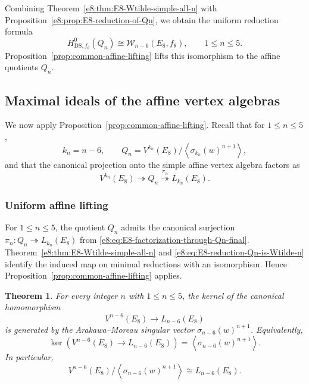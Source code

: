 \documentclass[11pt,reqno]{amsart}
\newtheorem{theorem}{Theorem}[section]
\theoremstyle{definition}
\theoremstyle{remark}
\providecommand{\W}{\mathcal{W}}
\providecommand{\DS}{\mathrm{DS}}
\begin{document}
Combining Theorem~\ref{e8:thm:E8-Wtilde-simple-all-n} with
Proposition~\ref{e8:prop:E8-reduction-of-Qn}, we obtain the uniform reduction
formula
\begin{equation}
  H^0_{\DS,f_\theta}(Q_n)
  \cong\W_{n-6}(E_8,f_\theta),
  \qquad 1\le n\le5.
  \label{e8:eq:E8-reduction-Qn-simple-W-all-n}
\end{equation}
Proposition~\ref{prop:common-affine-lifting} lifts this isomorphism to the
affine quotients $Q_n$.

\subsection{Maximal ideals of the affine vertex algebras}


We now apply Proposition~\ref{prop:common-affine-lifting}.  Recall that
for $1\le n\le5$,
\begin{equation*}
  k_n=n-6,
  \qquad
  Q_n
  =V^{k_n}(E_8)/\left\langle\sigma_{k_n}(w)^{n+1}\right\rangle,
\end{equation*}
and that the canonical projection onto the simple affine vertex algebra
factors as
\begin{equation}
  V^{k_n}(E_8)
  \twoheadrightarrow Q_n
  \overset{\pi_n}{\twoheadrightarrow}L_{k_n}(E_8).
  \label{e8:eq:E8-factorization-through-Qn-final}
\end{equation}
\subsubsection{Uniform affine lifting}


For $1\le n\le5$, the quotient $Q_n$ admits the canonical surjection
$\pi_n:Q_n\twoheadrightarrow L_{k_n}(E_8)$ from
\eqref{e8:eq:E8-factorization-through-Qn-final}.
Theorem~\ref{e8:thm:E8-Wtilde-simple-all-n} and
\eqref{e8:eq:E8-reduction-Qn-is-Wtilde-n} identify the induced map on minimal
reductions with an isomorphism.  Hence
Proposition~\ref{prop:common-affine-lifting} applies.

\begin{theorem}
\label{e8:thm:E8-maximal-ideals-all-negative-cases}
For every integer $n$ with $1\le n\le5$, the kernel of the canonical
homomorphism
\begin{equation*}
  V^{n-6}(E_8)\longrightarrow L_{n-6}(E_8)
\end{equation*}
is generated by the Arakawa--Moreau singular vector
$\sigma_{n-6}(w)^{n+1}$.  Equivalently,
\begin{equation}
  \ker\!\left(
    V^{n-6}(E_8)\longrightarrow L_{n-6}(E_8)
  \right)
  =\left\langle\sigma_{n-6}(w)^{n+1}\right\rangle.
  \label{e8:eq:E8-maximal-ideal-uniform-formula}
\end{equation}
In particular,
\begin{equation*}
  V^{n-6}(E_8)
  \Big/\left\langle\sigma_{n-6}(w)^{n+1}\right\rangle
  \cong L_{n-6}(E_8).
\end{equation*}
\end{theorem}
\end{document}
